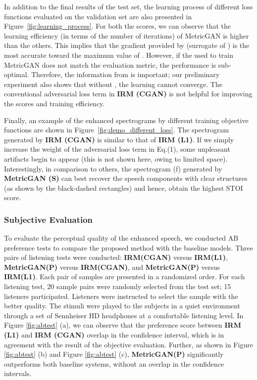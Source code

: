 \documentclass{article}
\begin{document}
In addition to the final results of the test set, the learning process of different loss functions evaluated on the validation set are also presented in Figure~\ref{fig:learning_process}. For both the scores, we can observe that the learning efficiency (in terms of the number of iterations) of MetricGAN is higher than the others. This implies that the gradient provided by  (surrogate of ) is the most accurate toward the maximum value of . However, if the  used to train MetricGAN does not match the evaluation metric, the performance is sub-optimal. Therefore, the information from  is important; our preliminary experiment also shows that without , the learning cannot converge. The conventional adversarial loss term in \textbf{IRM (CGAN)} is not helpful for improving the scores and training efficiency.

Finally, an example of the enhanced spectrograms by different training objective functions are shown in Figure~\ref{fig:demo_different_loss}. The spectrogram generated by \textbf{IRM (CGAN)} is similar to that of \textbf{IRM (L1)}. If we simply increase the weight  of the adversarial loss term in Eq.(1), some unpleasant artifacts begin to appear (this is not shown here, owing to limited space). Interestingly, in comparison to others, the spectrogram (f) generated by \textbf{MetricGAN (S)} can best recover the speech components with clear structures (as shown by the black-dashed rectangles) and hence, obtain the highest STOI score.

\subsubsection{Subjective Evaluation}
To evaluate the perceptual quality of the enhanced speech, we conducted AB preference tests to compare the proposed method with the baseline models. Three pairs of listening tests were conducted: \textbf{IRM(CGAN)} versus \textbf{IRM(L1)}, \textbf{MetricGAN(P)} versus \textbf{IRM(CGAN)}, and \textbf{MetricGAN(P)} versus \textbf{IRM(L1)}. Each pair of samples are presented in a randomized order. For each listening test, 20 sample pairs were randomly selected from the test set; 15 listeners participated. Listeners were instructed to select the sample with the better quality. The stimuli were played to the subjects in a quiet environment through a set of Sennheiser HD headphones at a comfortable listening level. In Figure \ref{fig:abtest} (a), we can observe that the preference score between \textbf{IRM (L1)} and \textbf{IRM (CGAN)} overlap in the confidence interval, which is in agreement with the result of the objective evaluation. Further, as shown in Figure \ref{fig:abtest} (b) and Figure \ref{fig:abtest} (c), \textbf{MetricGAN(P)} significantly outperforms both baseline systems, without an overlap in the confidence intervals.
\end{document}
